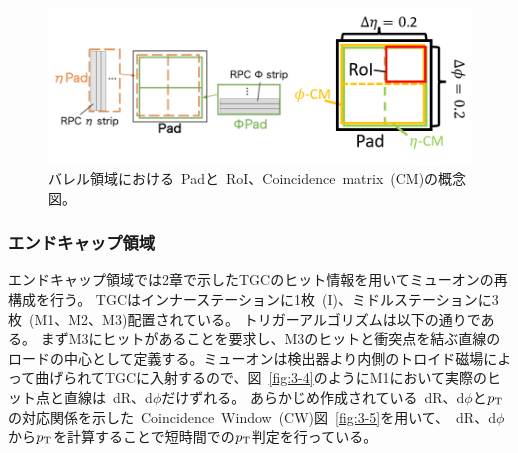\begin{figure}[h]
  \centering
  \includegraphics[clip, width=13cm]{fig/3/L1_RoI_CM.png}
  \caption{バレル領域における~Padと~RoI、Coincidence~matrix~(CM)の概念図。}
  \label{fig:3-3}
\end{figure}

\subsubsection{エンドキャップ領域}
エンドキャップ領域では2章で示したTGCのヒット情報を用いてミューオンの再構成を行う。
TGCはインナーステーションに1枚~(I)、ミドルステーションに3枚~(M1、M2、M3)配置されている。
トリガーアルゴリズムは以下の通りである。
まずM3にヒットがあることを要求し、M3のヒットと衝突点を結ぶ直線のロードの中心として定義する。ミューオンは検出器より内側のトロイド磁場によって曲げられてTGCに入射するので、図~\ref{fig:3-4}のようにM1において実際のヒット点と直線は~dR、d$\phi$だけずれる。
あらかじめ作成されている~dR、d$\phi$と$p_\mathrm{T}$の対応関係を示した~Coincidence~Window~(CW)図~\ref{fig:3-5}を用いて、~dR、d$\phi$から$p_\mathrm{T}$を計算することで短時間での$p_\mathrm{T}$判定を行っている。


